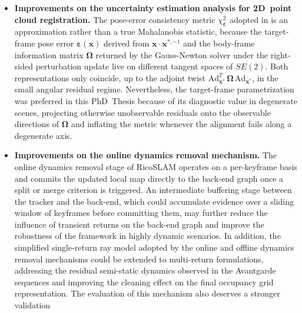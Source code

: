 \begin{itemize}
compounding of finite-difference errors when approximating both the
gradient and the Hessian of the distance field. Alternative strategies
to estimate these quantities, such as semi-analytical formulations that combine
the analytical gradient at $\mathcal{M}_1$ with a smoothed Hessian, or
truncated-distance reformulations that explicitly handle the
truncation boundaries, may reduce this sensitivity and improve the
robustness of the precomputed point-to-plane variant under noise.
\item \textbf{Improvements on the uncertainty estimation analysis for
2D~point cloud registration.}
The pose-error consistency metric
$\chi^2_{\boldsymbol{\varepsilon}}$ adopted in
 is an
approximation rather than a true Mahalanobis statistic, because the
target-frame pose error
$\boldsymbol{\varepsilon}\!\left(\mathbf{x}\right)$ derived from
$\mathbf{x}\cdot\mathbf{x}^{*,-1}$ and the body-frame information
matrix $\boldsymbol{\Omega}$ returned by the Gauss-Newton solver
under the right-sided perturbation update live on different tangent
spaces of $SE(2)$. Both representations only coincide, up to the
adjoint twist $\mathrm{Ad}_{\mathbf{x}^*}^T\,\boldsymbol{\Omega}\,
\mathrm{Ad}_{\mathbf{x}^*}$, in the small angular residual regime.
Nevertheless, the target-frame parametrization was preferred in this
PhD~Thesis because of its diagnostic value in degenerate scenes,
projecting otherwise unobservable residuals onto the observable directions of
$\boldsymbol{\Omega}$ and inflating the metric whenever the alignment
fails along a degenerate axis.
\item \textbf{Improvements on the online dynamics removal mechanism.}
The online dynamics removal stage of RicoSLAM operates on a
per-keyframe basis and commits the updated local map directly to the
back-end graph once a split or merge criterion is triggered. An
intermediate buffering stage between the tracker and the back-end,
which could accumulate evidence over a sliding window of keyframes
before committing them, may further reduce the influence of transient
returns on the back-end graph and improve the robustness of the
framework in highly dynamic scenarios. In addition, the simplified
single-return ray model adopted by the online and offline dynamics
removal mechanisms could be extended to multi-return formulations,
addressing the residual semi-static dynamics observed in the Avantgarde
sequences and improving the cleaning effect on the final occupancy
grid representation.
The evaluation of this mechanism also deserves a stronger validation

\end{itemize}
